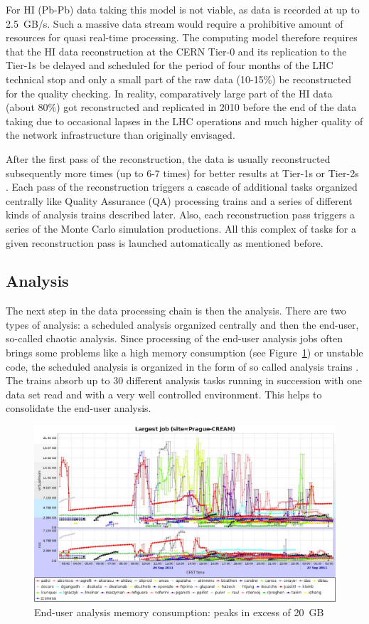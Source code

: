 For HI (Pb-Pb) data taking this model is not viable, as data is
recorded at up to 2.5~GB/s.  Such a massive data stream would
require a prohibitive amount of resources for quasi real-time
processing. The computing model therefore requires that the HI data
reconstruction at the CERN Tier-0 and its replication to the Tier-1s
be delayed and scheduled for the period of four months of the LHC
technical stop and only a small part of the raw data (10-15\%) be
reconstructed for the quality checking. In reality, comparatively
large part of the HI data (about 80\%) got reconstructed and
replicated in 2010 before the end of the data taking due to
occasional lapses in the LHC operations and much higher quality of
the network infrastructure than originally envisaged.

After the first pass of the reconstruction, the data is usually
reconstructed subsequently more times (up to 6-7 times) for better
results at Tier-1s or Tier-2s . Each pass of the reconstruction
triggers a cascade of additional tasks organized centrally like
Quality Assurance (QA) processing trains and a series of different
kinds of analysis trains described later. Also, each reconstruction
pass triggers a series of the Monte Carlo simulation productions.
All this complex of tasks for a given reconstruction pass is
launched automatically as mentioned before.

\subsection{Analysis}
%
The next step in the data processing chain is then the analysis.
There are two types of analysis: a scheduled analysis organized
centrally and then the end-user, so-called chaotic analysis. Since
processing of the end-user analysis jobs often brings some problems
like a high memory consumption (see Figure~\ref{fig12}) or unstable
code, the scheduled analysis is organized in the form of so called
analysis trains \cite{trains}. The trains absorb up to 30 different
analysis tasks running in succession with one data set read and with
a very well controlled environment. This helps to consolidate the
end-user analysis.

\begin{figure}[htb] %
\centering
\includegraphics[width=13cm]{fig12.eps} %
\caption{End-user analysis memory consumption: peaks in excess of
20~GB}\label{fig12}
\end{figure}


